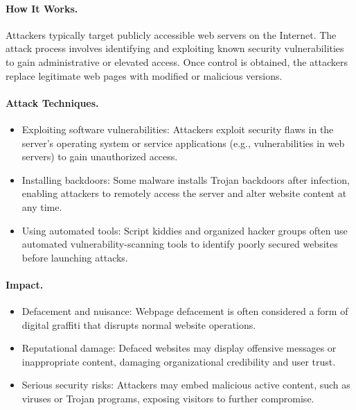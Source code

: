 \paragraph{How It Works.}
Attackers typically target publicly accessible web servers on the Internet. The attack process involves identifying and exploiting known security vulnerabilities to gain administrative or elevated access. Once control is obtained, the attackers replace legitimate web pages with modified or malicious versions.

\paragraph{Attack Techniques.}
\begin{itemize}
  \item Exploiting software vulnerabilities: Attackers exploit security flaws in the server's operating system or service applications (e.g., vulnerabilities in web servers) to gain unauthorized access.
  \item Installing backdoors: Some malware installs Trojan backdoors after infection, enabling attackers to remotely access the server and alter website content at any time.
  \item Using automated tools: Script kiddies and organized hacker groups often use automated vulnerability-scanning tools to identify poorly secured websites before launching attacks.
\end{itemize}

\paragraph{Impact.}
\begin{itemize}
  \item Defacement and nuisance: Webpage defacement is often considered a form of digital graffiti that disrupts normal website operations.
  \item Reputational damage: Defaced websites may display offensive messages or inappropriate content, damaging organizational credibility and user trust.
  \item Serious security risks: Attackers may embed malicious active content, such as viruses or Trojan programs, exposing visitors to further compromise.
\end{itemize}

